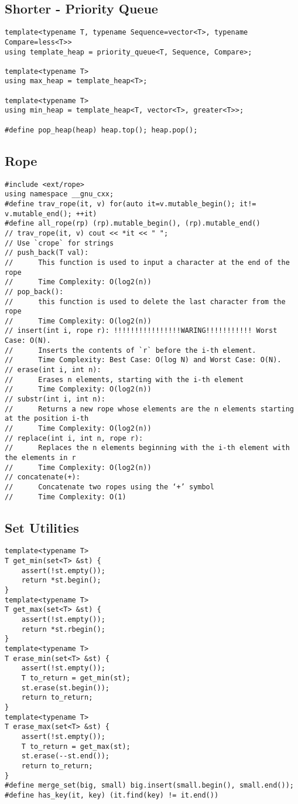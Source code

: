 \documentclass[10pt,letterpaper,twocolumn,twosided]{article}
\begin{document}
\subsection{Shorter - Priority Queue}
\begin{lstlisting}
template<typename T, typename Sequence=vector<T>, typename Compare=less<T>>
using template_heap = priority_queue<T, Sequence, Compare>;

template<typename T>
using max_heap = template_heap<T>;

template<typename T>
using min_heap = template_heap<T, vector<T>, greater<T>>;

#define pop_heap(heap) heap.top(); heap.pop();
\end{lstlisting}

\subsection{Rope}
\begin{lstlisting}
#include <ext/rope>
using namespace __gnu_cxx;
#define trav_rope(it, v) for(auto it=v.mutable_begin(); it!= v.mutable_end(); ++it)
#define all_rope(rp) (rp).mutable_begin(), (rp).mutable_end()
// trav_rope(it, v) cout << *it << " ";
// Use `crope` for strings
// push_back(T val): 
//      This function is used to input a character at the end of the rope
//      Time Complexity: O(log2(n))
// pop_back():
//      this function is used to delete the last character from the rope
//      Time Complexity: O(log2(n))
// insert(int i, rope r): !!!!!!!!!!!!!!!!WARING!!!!!!!!!!! Worst Case: O(N).
//      Inserts the contents of `r` before the i-th element.
//      Time Complexity: Best Case: O(log N) and Worst Case: O(N). 
// erase(int i, int n):
//      Erases n elements, starting with the i-th element
//      Time Complexity: O(log2(n))
// substr(int i, int n):
//      Returns a new rope whose elements are the n elements starting at the position i-th
//      Time Complexity: O(log2(n))
// replace(int i, int n, rope r):
//      Replaces the n elements beginning with the i-th element with the elements in r
//      Time Complexity: O(log2(n))
// concatenate(+):
//      Concatenate two ropes using the ‘+’ symbol
//      Time Complexity: O(1)
\end{lstlisting}

\subsection{Set Utilities}
\begin{lstlisting}
template<typename T>
T get_min(set<T> &st) {
    assert(!st.empty());
    return *st.begin();
}
template<typename T>
T get_max(set<T> &st) {
    assert(!st.empty());
    return *st.rbegin();
}
template<typename T>
T erase_min(set<T> &st) {
    assert(!st.empty());
    T to_return = get_min(st);
    st.erase(st.begin());
    return to_return;
}
template<typename T>
T erase_max(set<T> &st) {
    assert(!st.empty());
    T to_return = get_max(st);
    st.erase(--st.end());
    return to_return;
}
#define merge_set(big, small) big.insert(small.begin(), small.end());
#define has_key(it, key) (it.find(key) != it.end())
\end{lstlisting}
\end{document}
